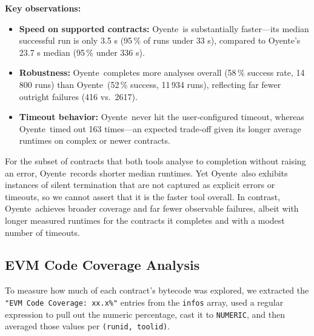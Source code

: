 \documentclass{article}
\newcommand\OY{Oyente}
\newcommand\OYp{\OY\raisebox{0.3ex}{\smaller +}}
\begin{document}
	\noindent
	\textbf{Key observations:}
	\begin{itemize}
		\item \textbf{Speed on supported contracts:}
		\OY\ is substantially faster—its median successful run is only 3.5 s (95\,\% of runs under 33 s), compared to \OYp’s 23.7 s median (95\,\% under 336 s).
		\item \textbf{Robustness:}
		\OYp\ completes more analyses overall (58\,\% success rate, 14\,800 runs) than \OY\ (52\,\% success, 11\,934 runs), reflecting far fewer outright failures (416 vs.\ 2617).
		\item \textbf{Timeout behavior:}
		\OY\ never hit the user‐configured timeout, whereas \OYp\ timed out 163 times—an expected trade‐off given its longer average runtimes on complex or newer contracts.
	\end{itemize}

	For the subset of contracts that both tools analyse to completion without
	raising an error, \OY\ records shorter median runtimes.  Yet \OY\ also
	exhibits instances of silent termination that are not captured as explicit
	errors or timeouts, so we cannot assert that it is the faster tool overall.
	In contrast, \OYp\ achieves broader coverage and far fewer observable
	failures, albeit with longer measured runtimes for the contracts it completes
	and with a modest number of timeouts.

	\subsection{EVM Code Coverage Analysis}
	To measure how much of each contract’s bytecode was explored, we extracted the \texttt{"EVM Code Coverage: xx.x\%"} entries from the \texttt{infos} array, used a regular expression to pull out the numeric percentage, cast it to \texttt{NUMERIC}, and then averaged those values per \texttt{(runid, toolid)}.
\end{document}
